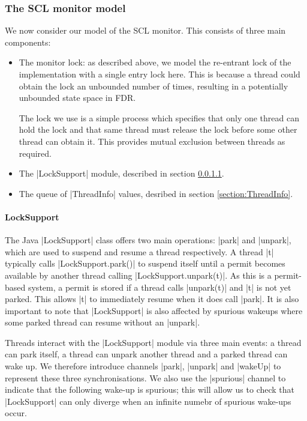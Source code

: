 \subsubsection{The SCL monitor model}


We now consider our model of the SCL monitor. This consists of three main components: 
\begin{itemize}
  \item The monitor lock: as described above, we model the re-entrant lock of the implementation with a single entry lock here. This is because a thread could obtain the lock an unbounded number of times, resulting in a potentially unbounded state space in FDR. 
  
  The lock we use is a simple process  which specifies that only one thread can hold the lock and that same thread must release the lock before some other thread can obtain it. This provides mutual exclusion between threads as required.
  \item The |LockSupport| module, described in section \ref{section:LockSupport}.
  \item The queue of |ThreadInfo| values, desribed in section \ref{section:ThreadInfo}.
\end{itemize}

\paragraph{LockSupport}\label{section:LockSupport}

The Java |LockSupport|  class offers two main operations: |park| and |unpark|, which are used to suspend and resume a thread respectively. A thread |t| typically calls |LockSupport.park()| to suspend itself until a permit becomes available by another thread calling |LockSupport.unpark(t)|. As this is a permit-based system, a permit is stored if a thread calls |unpark(t)| and |t| is not yet parked. This allows |t| to immediately resume when it does call |park|.
It is also important to note that |LockSupport| is also affected by spurious wakeups where some parked thread can resume without an |unpark|. 

Threads interact with the |LockSupport| module via three main events: a thread can park itself, a thread can unpark another thread and a parked thread can wake up. We therefore introduce channels |park|, |unpark| and |wakeUp| to represent these three synchronisations. We also use the |spurious| channel to indicate that the following wake-up is spurious; this will allow us to check that |LockSupport| can only diverge when an infinite numebr of spurious wake-ups occur.


